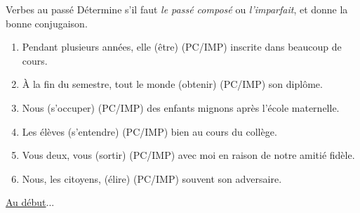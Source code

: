 \begin{frame}{Verbes au passé}
  \small
  Détermine s'il faut \emph{le passé composé} ou \emph{l'imparfait}, et donne la bonne conjugaison.
  \begin{enumerate}
    \item Pendant plusieurs années, elle \underline{} (être) (PC/\alert<2->{IMP}) inscrite dans beaucoup de cours.
    \item À la fin du semestre, tout le monde \underline{} (obtenir) (\alert<3->{PC}/IMP) son diplôme.
    \item Nous \underline{} (s'occuper) (\alert<4->{PC}/IMP) des enfants mignons après l'école maternelle.
    \item Les élèves \underline{} (s'entendre) (PC/\alert<5->{IMP}) bien au cours du collège.
    \item Vous deux, vous \underline{} (sortir) (\alert<6->{PC}/IMP) avec moi en raison de notre amitié fidèle.
    \item Nous, les citoyens, \underline{} (élire) (PC/\alert<7->{IMP}) souvent son adversaire.
  \end{enumerate}
  \raggedleft\raggedleft\hyperlink{début}{Au début}...
\end{frame}